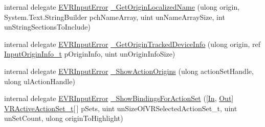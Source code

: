 \begin{DoxyCompactItemize}
\item 
internal delegate \mbox{\hyperlink{namespace_valve_1_1_v_r_a592d7f4189b8346d6c96dbdbaa35bc1b}{E\+V\+R\+Input\+Error}} \mbox{\hyperlink{struct_valve_1_1_v_r_1_1_i_v_r_input_a17e8c670555ed63bd87786abfe4f7b1c}{\+\_\+\+Get\+Origin\+Localized\+Name}} (ulong origin, System.\+Text.\+String\+Builder pch\+Name\+Array, uint un\+Name\+Array\+Size, int un\+String\+Sections\+To\+Include)
\item 
internal delegate \mbox{\hyperlink{namespace_valve_1_1_v_r_a592d7f4189b8346d6c96dbdbaa35bc1b}{E\+V\+R\+Input\+Error}} \mbox{\hyperlink{struct_valve_1_1_v_r_1_1_i_v_r_input_add5ead75e93d50c200dd32cfd51abb31}{\+\_\+\+Get\+Origin\+Tracked\+Device\+Info}} (ulong origin, ref \mbox{\hyperlink{struct_valve_1_1_v_r_1_1_input_origin_info__t}{Input\+Origin\+Info\+\_\+t}} p\+Origin\+Info, uint un\+Origin\+Info\+Size)
\item 
internal delegate \mbox{\hyperlink{namespace_valve_1_1_v_r_a592d7f4189b8346d6c96dbdbaa35bc1b}{E\+V\+R\+Input\+Error}} \mbox{\hyperlink{struct_valve_1_1_v_r_1_1_i_v_r_input_a09f1677e540d63032f2fd346bcde9ff7}{\+\_\+\+Show\+Action\+Origins}} (ulong action\+Set\+Handle, ulong ul\+Action\+Handle)
\item 
internal delegate \mbox{\hyperlink{namespace_valve_1_1_v_r_a592d7f4189b8346d6c96dbdbaa35bc1b}{E\+V\+R\+Input\+Error}} \mbox{\hyperlink{struct_valve_1_1_v_r_1_1_i_v_r_input_a88a0bc2f348e8f0bf77bf25907434041}{\+\_\+\+Show\+Bindings\+For\+Action\+Set}} (\mbox{[}\mbox{\hyperlink{namespace_valve_1_1_v_r_a1e6192cb5ddaf204afab87ccb5728780aefeb369cccbd560588a756610865664c}{In}}, \mbox{\hyperlink{namespace_valve_1_1_v_r_a1e6192cb5ddaf204afab87ccb5728780a7c147cda9e49590f6abe83d118b7353b}{Out}}\mbox{]} \mbox{\hyperlink{struct_valve_1_1_v_r_1_1_v_r_active_action_set__t}{V\+R\+Active\+Action\+Set\+\_\+t}}\mbox{[}$\,$\mbox{]} p\+Sets, uint un\+Size\+Of\+V\+R\+Selected\+Action\+Set\+\_\+t, uint un\+Set\+Count, ulong origin\+To\+Highlight)
\end{DoxyCompactItemize}
